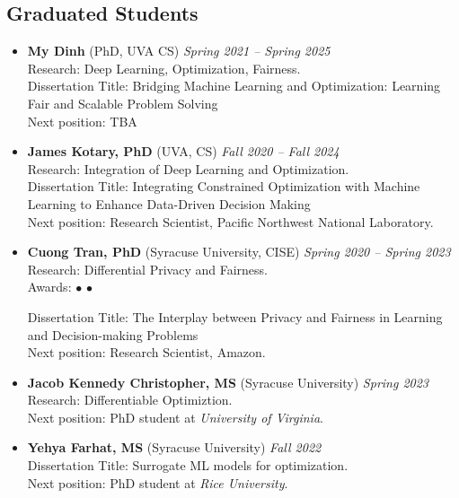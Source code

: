 \subsection*{Graduated Students}
\begin{itemize}

  \item \textbf{My Dinh} (PhD, {\sc UVA} CS) 
  \hfill{\em Spring 2021 -- Spring 2025}\\
  {\sc Research}: Deep Learning, Optimization, Fairness.\\
  {\sc Dissertation Title}: Bridging Machine Learning and Optimization: Learning Fair and Scalable Problem Solving\\
  {\sc Next position:} TBA

  \item \textbf{James Kotary, PhD} ({\sc UVA}, CS) 
  \hfill{\em Fall 2020 -- Fall 2024}\\
  {\sc Research}: Integration of Deep Learning and Optimization.\\
  {\sc Dissertation Title}: Integrating Constrained Optimization with Machine Learning to Enhance Data-Driven Decision Making\\
  {\sc Next position:} Research Scientist, Pacific Northwest National Laboratory.

  \item \textbf{Cuong Tran, PhD} ({\sc Syracuse University}, CISE) 
  \hfill{\em Spring 2020 -- Spring 2023}\\
  {\sc Research}: Differential Privacy and Fairness.\\
  {\sc Awards:} 
  $\bullet$  
  $\bullet$  

  {\sc Dissertation Title:} The Interplay between Privacy and Fairness in
  Learning and Decision-making Problems\\
  {\sc Next position:} Research Scientist, Amazon.

  \item \textbf{Jacob Kennedy Christopher, MS} ({\sc  Syracuse University}) \hfill{\em Spring 2023}\\
  {\sc Research:} Differentiable Optimiztion.\\
  {\sc Next position:} PhD student at \textit{University of Virginia}.

  \item \textbf{Yehya Farhat, MS} ({\sc Syracuse University}) \hfill{\em Fall 2022}\\
  {\sc Dissertation Title:} Surrogate ML models for optimization.\\
  {\sc Next position:} PhD student at \textit{Rice University}.

\end{itemize}

